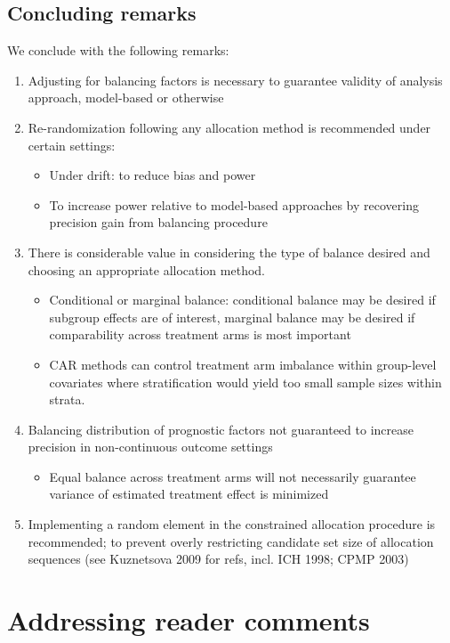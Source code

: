 \subsection{Concluding remarks}
We conclude with the following remarks:
\begin{enumerate}
	\item Adjusting for balancing factors is necessary to guarantee validity of analysis approach, model-based or otherwise
	\item Re-randomization following any allocation method is recommended under certain settings: 
	\begin{itemize}
		\item Under drift: to reduce bias and power
		\item To increase power relative to model-based approaches by recovering precision gain from balancing procedure
	\end{itemize}
	\item There is considerable value in considering the type of balance desired and choosing an appropriate allocation method.
	\begin{itemize}
		\item Conditional or marginal balance: conditional balance may be desired if subgroup effects are of interest, marginal balance may be desired if comparability across treatment arms is most important
		\item CAR methods can control treatment arm imbalance within group-level covariates where stratification would yield too small sample sizes within strata.
	\end{itemize}
	\item Balancing distribution of prognostic factors not guaranteed to increase precision in non-continuous outcome settings
	\begin{itemize}
		\item Equal balance across treatment arms will not necessarily guarantee variance of estimated treatment effect is minimized
	\end{itemize}
	\item Implementing a random element in the constrained allocation procedure is recommended; to prevent overly restricting candidate set size of allocation sequences (see Kuznetsova 2009 for refs, incl. ICH 1998; CPMP 2003)
\end{enumerate}



\section{Addressing reader comments}
